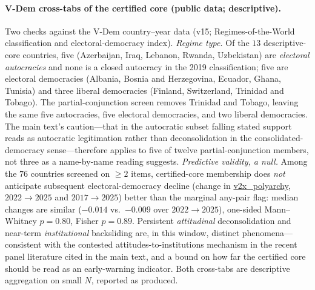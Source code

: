 \documentclass[12pt]{article}
\newcommand{\code}[1]{\begingroup\urlstyle{tt}\url{#1}\endgroup}
\theoremstyle{definition}
\theoremstyle{remark}
\begin{document}
\paragraph{V-Dem cross-tabs of the certified core (public data; descriptive).}
Two checks against the V-Dem country--year data (v15; Regimes-of-the-World
classification and electoral-democracy index).
\emph{Regime type.} Of the $13$ descriptive-core countries, five (Azerbaijan, Iraq,
Lebanon, Rwanda, Uzbekistan) are \emph{electoral autocracies} and none is a closed
autocracy in the 2019 classification; five are electoral democracies (Albania,
Bosnia and Herzegovina, Ecuador, Ghana, Tunisia) and three liberal democracies
(Finland, Switzerland, Trinidad and Tobago). The partial-conjunction screen
removes Trinidad and Tobago, leaving the same five autocracies, five electoral
democracies, and two liberal democracies. The main text's caution---that in the
autocratic subset falling stated support reads as autocratic legitimation rather
than deconsolidation in the consolidated-democracy sense---therefore applies to
five of twelve partial-conjunction members, not three as a name-by-name reading
suggests.
\emph{Predictive validity, a null.} Among the $76$ countries screened on $\ge2$
items, certified-core membership does \emph{not} anticipate subsequent
electoral-democracy decline (change in \code{v2x_polyarchy}, $2022\to2025$ and
$2017\to2025$) better than the marginal any-pair flag: median changes are similar
($-0.014$ vs.\ $-0.009$ over $2022\to2025$), one-sided Mann--Whitney $p=0.80$,
Fisher $p=0.89$. Persistent \emph{attitudinal} deconsolidation and near-term
\emph{institutional} backsliding are, in this window, distinct phenomena---
consistent with the contested attitudes-to-institutions mechanism in the recent
panel literature cited in the main text, and a bound on how far the certified core
should be read as an early-warning indicator. Both cross-tabs are descriptive
aggregation on small $N$, reported as produced.

\FloatBarrier



\end{document}

